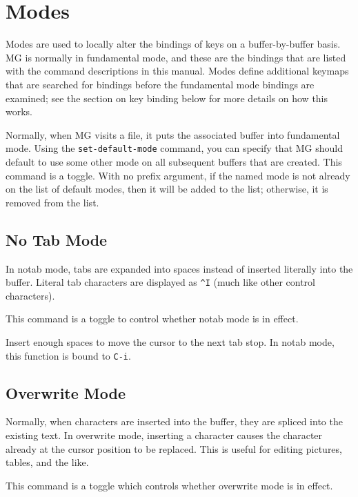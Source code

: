 \chapter{Modes}

Modes are used to locally alter the bindings of keys on a 
buffer-by-buffer basis.  MG is normally in fundamental mode, and these
are the bindings that are listed with the command descriptions in 
this manual.  Modes define additional keymaps that are searched for
bindings before the fundamental mode bindings are examined; see the
section on key binding below for more details on how this works.

\fbody Normally, when MG visits a file, it puts the associated buffer
into fundamental mode.  Using the {\tt set-default-mode} command, you
can specify that MG should default to use some other mode on all subsequent
buffers that are created.  This command is a toggle.  With no prefix
argument, if the named mode is not already on the list of
default modes, then it will be added to the list; otherwise, it is removed
from the list.

\section{No Tab Mode}

In notab mode, tabs are expanded into spaces instead of inserted
literally into the buffer.  Literal tab characters are displayed as
\verb"^I" (much like other control characters).

\fbody This command is a toggle to control whether notab mode is in effect.

\fbody Insert enough spaces to move the cursor to the next tab stop.  In
notab mode, this function is bound to {\tt C-i}.


\section{Overwrite Mode}

Normally, when characters are inserted into the buffer, they are spliced
into the existing text.  In overwrite mode, inserting a character causes
the character already at the cursor position to be replaced.  This is
useful for editing pictures, tables, and the like.

\fbody This command is a toggle which controls whether overwrite mode is
in effect.

